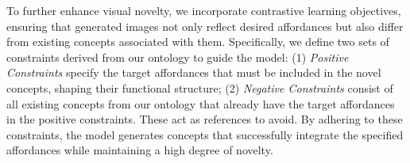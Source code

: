 To further enhance visual novelty, we incorporate contrastive learning objectives, ensuring that generated images not only reflect desired affordances but also differ from existing concepts associated with them. Specifically, we define two sets of constraints derived from our ontology to guide the model: (1) \textit{Positive Constraints} specify the target affordances that must be included in the novel concepts, shaping their functional structure; (2) \textit{Negative Constraints} consist of all existing concepts from our ontology that already have the target affordances in the positive constraints. These act as references to avoid. By adhering to these constraints, the model generates concepts that successfully integrate the specified affordances while maintaining a high degree of novelty. 




